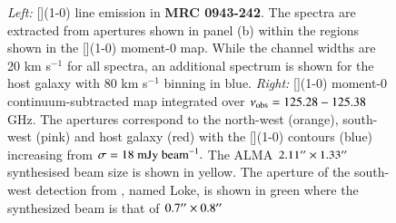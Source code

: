 \begin{figure}
\hspace*{-50pt}
\centering
  \caption[{MRC 0943-242 [](1-0) line spectra and moment-0 maps}]{{\it Left:} [](1-0) line emission in {\bf MRC 0943-242}. The spectra are extracted from apertures shown in panel (b) within the regions shown in the [](1-0) moment-0 map. While the channel widths are 20 km s$^{-1}$ for all spectra, an additional spectrum is shown for the host galaxy with 80 km s$^{-1}$ binning in blue. {\it Right:} [](1-0) moment-0 continuum-subtracted map integrated over $\nu_{\rm obs}=125.28-125.38$ GHz. The apertures correspond to the north-west (orange), south-west (pink) and host galaxy (red) with the [](1-0) contours (blue) increasing from $\sigma=18~\rm{mJy~beam}^{-1}.$ The ALMA $2.11^{\prime\prime} \times 1.33 ^{\prime\prime}$ synthesised beam size is shown in yellow. The aperture of the south-west detection from \citet{Gullberg2016a}, named Loke, is shown in green where the synthesized beam is that of $0.7 ^{\prime\prime} \times 0.8 ^{\prime\prime}$}
  \label{fig:MRC0943-fit-CI-moment0}
\end{figure}

